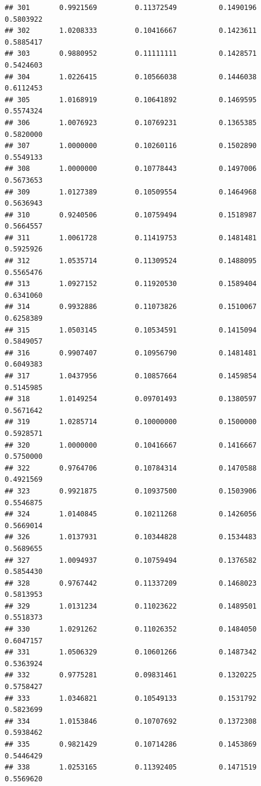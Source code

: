 \documentclass[]{article}
\begin{document}
\begin{verbatim}
## 301       0.9921569         0.11372549          0.1490196        0.5803922
## 302       1.0208333         0.10416667          0.1423611        0.5885417
## 303       0.9880952         0.11111111          0.1428571        0.5424603
## 304       1.0226415         0.10566038          0.1446038        0.6112453
## 305       1.0168919         0.10641892          0.1469595        0.5574324
## 306       1.0076923         0.10769231          0.1365385        0.5820000
## 307       1.0000000         0.10260116          0.1502890        0.5549133
## 308       1.0000000         0.10778443          0.1497006        0.5673653
## 309       1.0127389         0.10509554          0.1464968        0.5636943
## 310       0.9240506         0.10759494          0.1518987        0.5664557
## 311       1.0061728         0.11419753          0.1481481        0.5925926
## 312       1.0535714         0.11309524          0.1488095        0.5565476
## 313       1.0927152         0.11920530          0.1589404        0.6341060
## 314       0.9932886         0.11073826          0.1510067        0.6258389
## 315       1.0503145         0.10534591          0.1415094        0.5849057
## 316       0.9907407         0.10956790          0.1481481        0.6049383
## 317       1.0437956         0.10857664          0.1459854        0.5145985
## 318       1.0149254         0.09701493          0.1380597        0.5671642
## 319       1.0285714         0.10000000          0.1500000        0.5928571
## 320       1.0000000         0.10416667          0.1416667        0.5750000
## 322       0.9764706         0.10784314          0.1470588        0.4921569
## 323       0.9921875         0.10937500          0.1503906        0.5546875
## 324       1.0140845         0.10211268          0.1426056        0.5669014
## 326       1.0137931         0.10344828          0.1534483        0.5689655
## 327       1.0094937         0.10759494          0.1376582        0.5854430
## 328       0.9767442         0.11337209          0.1468023        0.5813953
## 329       1.0131234         0.11023622          0.1489501        0.5518373
## 330       1.0291262         0.11026352          0.1484050        0.6047157
## 331       1.0506329         0.10601266          0.1487342        0.5363924
## 332       0.9775281         0.09831461          0.1320225        0.5758427
## 333       1.0346821         0.10549133          0.1531792        0.5823699
## 334       1.0153846         0.10707692          0.1372308        0.5938462
## 335       0.9821429         0.10714286          0.1453869        0.5446429
## 338       1.0253165         0.11392405          0.1471519        0.5569620

\end{verbatim}
\end{document}
